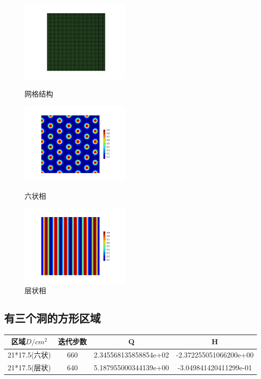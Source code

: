 \documentclass[12pt]{article}
\begin{document}
\begin{CJK}{UTF8}{gkai}
    
\begin{figure}[H]
	\setlength{\abovecaptionskip}{0.cm}
	\setlength{\belowcaptionskip}{-0.cm}
	\begin{minipage}[!htbp]{0.3\linewidth}
		\includegraphics[width=5.2cm]{22.png}
		\caption*{网格结构}
	\end{minipage}
	\hspace{0.23in}
	\begin{minipage}[!htbp]{0.3\linewidth}
		\includegraphics[width=5.2cm]{scftfigure200.png}
		\caption*{六状相}
	\end{minipage}
	\hspace{0.23in}
	\begin{minipage}[!htbp]{0.3\linewidth}
		\includegraphics[width=5.2cm]{scftfigure240.png}
		\caption*{层状相}
	\end{minipage}	
\end{figure}
      
 \subsection{有三个洞的方形区域}   
    \begin{table}[H]
    		\centering
    	\begin{tabular}{cccc}
    		\toprule
    		区域$D/cm^2$ &	迭代步数 & Q &  H \\
    		\midrule
    		21*17.5(六状)&660 &2.345568135858854e+02&-2.372255051066200e+00\\
    				21*17.5(层状)&640& 5.187955000344139e+00 & -3.049841420411299e-01\\
    		\bottomrule
    	\end{tabular}
    \end{table}
      

\end{CJK}
\end{document}
